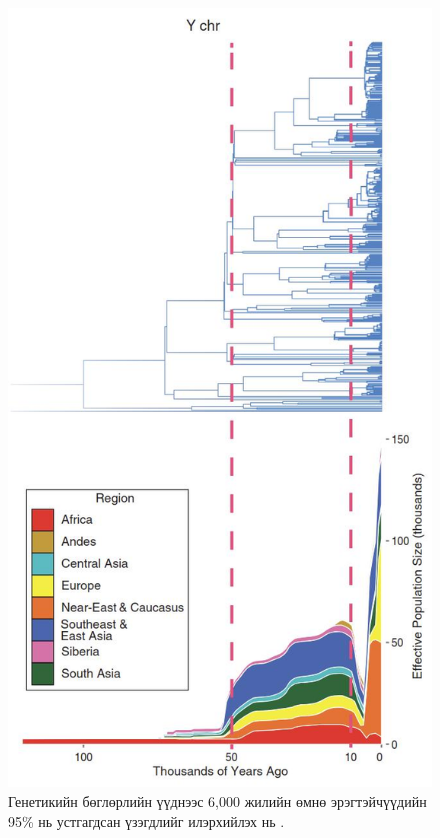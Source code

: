 \documentclass[10pt,twocolumn,letterpaper]{article}
\begin{document}
\begin{figure}[b]
\begin{center}
   \includegraphics[width=1\linewidth]{bottleneck.jpg}
\end{center}
   \caption{Генетикийн бөглөрлийн үүднээс 6,000 жилийн өмнө эрэгтэйчүүдийн 95\% нь устгагдсан үзэгдлийг илэрхийлэх нь \cite{62}.}
\label{fig:10}
\label{fig:onecol}
\end{figure}
\end{document}
